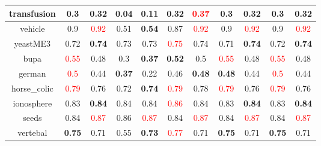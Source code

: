 \documentclass{article}%
\begin{document}
\begin{tabular}{c|cccccccccc}
\hline%
transfusion&0.3&\textbf{0.32}&0.04&\textbf{0.11}&0.32&\textcolor{red}{ 
0.37
}&0.3&\textbf{0.32}&0.3&\textbf{0.32}\\%
\hline%
vehicle&0.9&\textcolor{red}{ 
0.92
}&0.51&\textbf{0.54}&0.87&\textcolor{red}{ 
0.92
}&0.9&\textcolor{red}{ 
0.92
}&0.9&\textcolor{red}{ 
0.92
}\\%
\hline%
yeastME3&0.72&\textbf{0.74}&0.73&0.73&\textcolor{red}{ 
0.75
}&0.74&0.71&\textbf{0.74}&0.72&\textbf{0.74}\\%
\hline%
bupa&\textcolor{red}{ 
0.55
}&0.48&0.3&\textbf{0.37}&\textbf{0.52}&0.5&\textcolor{red}{ 
0.55
}&0.48&\textcolor{red}{ 
0.55
}&0.48\\%
\hline%
german&\textcolor{red}{ 
0.5
}&0.44&\textbf{0.37}&0.22&0.46&\textbf{0.48}&\textbf{0.48}&0.44&\textcolor{red}{ 
0.5
}&0.44\\%
\hline%
horse\_colic&\textcolor{red}{ 
0.79
}&0.76&0.72&\textbf{0.74}&\textcolor{red}{ 
0.79
}&0.78&\textcolor{red}{ 
0.79
}&0.76&\textcolor{red}{ 
0.79
}&0.76\\%
\hline%
ionosphere&0.83&\textbf{0.84}&0.84&0.84&\textcolor{red}{ 
0.86
}&0.84&0.83&\textbf{0.84}&0.83&\textbf{0.84}\\%
\hline%
seeds&0.84&\textcolor{red}{ 
0.87
}&0.86&\textcolor{red}{ 
0.87
}&0.84&\textcolor{red}{ 
0.87
}&0.84&\textcolor{red}{ 
0.87
}&0.84&\textcolor{red}{ 
0.87
}\\%
\hline%
vertebal&\textbf{0.75}&0.71&0.55&\textbf{0.73}&\textcolor{red}{ 
0.77
}&0.71&\textbf{0.75}&0.71&\textbf{0.75}&0.71\\%
\hline%
\end{tabular}

%
\end{document}
